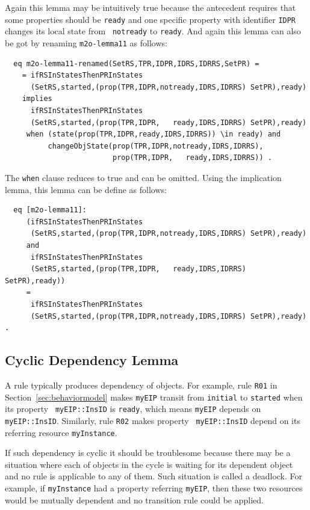 \documentclass[12pt]{report}
\begin{document}
Again this lemma may be intuitively true because the antecedent
requires that some properties should be {\tt ready} and one specific
property with identifier {\tt IDPR} changes its local state from {\tt
  notready} to {\tt ready}. And again this lemma can also be got by
renaming {\tt m2o-lemma11} as follows:
\begin{verbatim}
  eq m2o-lemma11-renamed(SetRS,TPR,IDPR,IDRS,IDRRS,SetPR) =
    = ifRSInStatesThenPRInStates
      (SetRS,started,(prop(TPR,IDPR,notready,IDRS,IDRRS) SetPR),ready)
    implies
      ifRSInStatesThenPRInStates
      (SetRS,started,(prop(TPR,IDPR,   ready,IDRS,IDRRS) SetPR),ready)
     when (state(prop(TPR,IDPR,ready,IDRS,IDRRS)) \in ready) and 
          changeObjState(prop(TPR,IDPR,notready,IDRS,IDRRS),
                         prop(TPR,IDPR,   ready,IDRS,IDRRS)) .
\end{verbatim}
The {\tt when} clause reduces to true and can be omitted. Using the
implication lemma, this lemma can be define as follows:
\begin{verbatim}
  eq [m2o-lemma11]:
     (ifRSInStatesThenPRInStates
      (SetRS,started,(prop(TPR,IDPR,notready,IDRS,IDRRS) SetPR),ready)
     and
      ifRSInStatesThenPRInStates
      (SetRS,started,(prop(TPR,IDPR,   ready,IDRS,IDRRS) SetPR),ready))
     = 
      ifRSInStatesThenPRInStates
      (SetRS,started,(prop(TPR,IDPR,notready,IDRS,IDRRS) SetPR),ready) .
\end{verbatim}

\subsection{Cyclic Dependency Lemma}
\label{sec:cyclelemma}
A rule typically produces dependency of objects.  For example, rule
{\tt R01} in Section~\ref{sec:behaviormodel} makes {\tt myEIP} transit
from {\tt initial} to {\tt started} when its property {\tt
  myEIP::InsID} is {\tt ready}, which means {\tt myEIP} depends on
{\tt myEIP::InsID}.  Similarly, rule {\tt R02} makes property {\tt
  myEIP::InsID} depend on its referring resource {\tt myInstance}.

If such dependency is cyclic it should be troublesome because there
may be a situation where each of objects in the cycle is waiting for
its dependent object and no rule is applicable to any of them. Such
situation is called a deadlock.  For example, if {\tt myInstance} had
a property referring {\tt myEIP}, then these two resources would be
mutually dependent and no transition rule could be applied.
\end{document}
